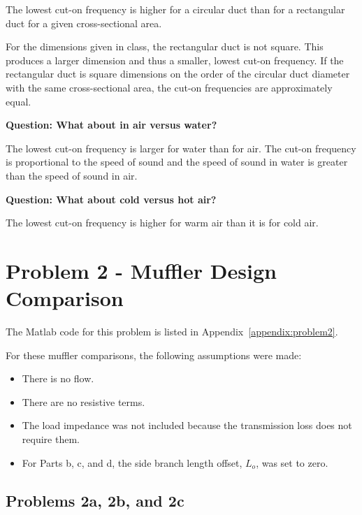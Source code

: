  The lowest cut-on frequency is higher for a circular duct than for a
 rectangular duct for a given cross-sectional area.

 For the dimensions given in class, the rectangular duct is not square.
 This produces a larger dimension and thus a smaller, lowest cut-on
 frequency.  If the rectangular duct is square dimensions on the order
 of the circular duct diameter with the same cross-sectional area, the
 cut-on frequencies are approximately equal.



\vspace{0.25cm}
\textbf{Question:  What about in air versus water?}

 The lowest cut-on frequency is larger for water than for air.  The cut-on
 frequency is proportional to the speed of sound and the speed of sound in
 water is greater than the speed of sound in air.



\vspace{0.25cm}
\textbf{Question:  What about cold versus hot air?}

 The lowest cut-on frequency is higher for warm air than it is for cold air.









\newpage
\section*{Problem 2 - Muffler Design Comparison}

The Matlab code for this problem is listed in Appendix~\ref{appendix:problem2}.

For these muffler comparisons, the following assumptions were made:

\begin{itemize}
  \item There is no flow.
  \item There are no resistive terms.
  \item The load impedance was not included because the transmission loss does not require them.
  \item For Parts b, c, and d, the side branch length offset, $L_o$, was set to zero.
\end{itemize}


\vspace{-0.25cm}
\subsection*{Problems 2a, 2b, and 2c}

